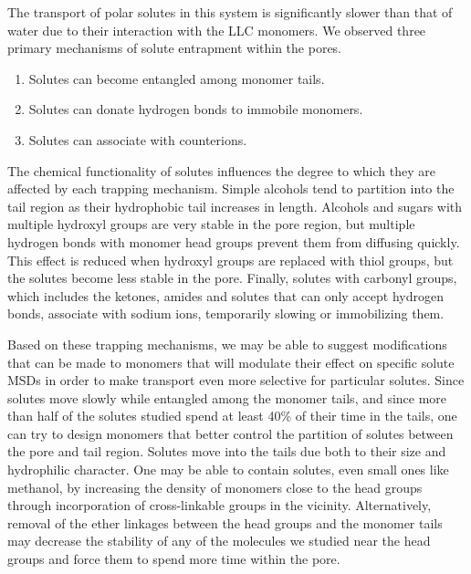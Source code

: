 \documentclass[journal=jpcbfk,manuscript=article]{achemso}
\begin{document}
  The transport of polar solutes in this system is significantly slower than
  that of water due to their interaction with the LLC monomers. We observed 
  three primary mechanisms of solute entrapment within the pores.
  \begin{enumerate}
    \item Solutes can become entangled among monomer tails. 
    \item Solutes can donate hydrogen bonds to immobile monomers.
    \item Solutes can associate with counterions.
  \end{enumerate}
  
  The chemical functionality of solutes influences the degree to which
  they are affected by each trapping mechanism. Simple alcohols tend to
  partition into the tail region as their hydrophobic tail increases in length.
  Alcohols and sugars with multiple hydroxyl groups are very stable
  in the pore region, but 
  multiple
  hydrogen bonds with monomer head 
  groups prevent them from diffusing quickly. This effect is reduced when
  hydroxyl groups are replaced with thiol groups, but the solutes become less
  stable in the pore. Finally, solutes with carbonyl groups, which includes
  the ketones, amides and solutes that can only accept hydrogen bonds, associate
  with sodium ions, temporarily slowing or immobilizing them. 

  Based on these trapping mechanisms, we may be able to suggest modifications
  that can be made to monomers that will modulate their effect on specific 
  solute MSDs in order to make transport even more selective for particular 
  solutes. 
  Since solutes move slowly while entangled among the monomer tails,
  and since more than half of the solutes studied spend at least 40\% of their
  time in the tails, one can try to design monomers that better control the 
  partition of solutes between the pore and tail region. Solutes move into 
  the tails due both to their size and hydrophilic character. One may be 
  able to contain solutes, even small ones like methanol, by increasing
  the density of monomers close to the head groups through incorporation of 
  cross-linkable groups in the vicinity. Alternatively, removal of the ether
  linkages between the head groups and the monomer tails may decrease the 
  stability of any of the molecules we studied near the head groups and 
  force them to spend more time within the pore. 
  
\end{document}

